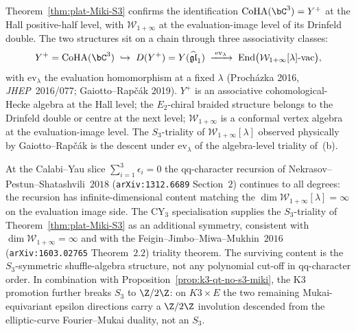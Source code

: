 \begin{remark}
\label{rem:coha-c3-equals-yplus-not-Winf}
Theorem~\ref{thm:plat-Miki-S3} confirms the identification
$\mathrm{CoHA}(\bC^3) = Y^+$ at the Hall positive-half level, with
$\mathcal W_{1 + \infty}$ at the evaluation-image level of its
Drinfeld double. The two structures sit on a chain through three
associativity classes:
\[
 Y^+ = \mathrm{CoHA}(\bC^3)
 \;\hookrightarrow\;
 D(Y^+) = Y(\widehat{\mathfrak{gl}}_1)
 \;\xrightarrow{\;\mathrm{ev}_\lambda\;}\;
 \mathrm{End}\bigl(\mathcal W_{1 + \infty}[\lambda]\text{-}\mathrm{vac}\bigr),
\]
with $\mathrm{ev}_\lambda$ the evaluation homomorphism at a fixed
$\lambda$ (Proch\'azka 2016, \emph{JHEP}\ 2016/077;
Gaiotto--Rap\v c\'ak 2019). $Y^+$ is an associative
cohomological-Hecke algebra at the Hall level; the $E_2$-chiral
braided structure belongs to the Drinfeld double or centre at the
next level; $\mathcal W_{1 + \infty}$ is a conformal vertex algebra
at the evaluation-image level. The $S_3$-triality of
$\mathcal W_{1 + \infty}[\lambda]$ observed physically by
Gaiotto--Rap\v c\'ak is the descent under $\mathrm{ev}_\lambda$ of
the algebra-level triality of~(b).
\end{remark}

\begin{remark}
\label{rmk:plat-CY3-non-truncation}
At the Calabi--Yau slice $\sum_{i=1}^{3} \epsilon_i = 0$ the
qq-character recursion of Nekrasov--Pestun--Shatashvili~$2018$
(\texttt{arXiv:1312.6689} Section~$2$) continues to all degrees: the
recursion has infinite-dimensional content matching the
$\dim \mathcal W_{1 + \infty}[\lambda] = \infty$ on the evaluation
image side. The CY$_3$ specialisation supplies the $S_3$-triality of
Theorem~\ref{thm:plat-Miki-S3} as an
additional symmetry, consistent with $\dim\mathcal W_{1+\infty}=\infty$
and with the Feigin--Jimbo--Miwa--Mukhin~$2016$
(\texttt{arXiv:1603.02765} Theorem~$2.2$) triality theorem. The
surviving content is the $S_3$-symmetric shuffle-algebra structure, not
any polynomial cut-off in qq-character order. In combination with
Proposition~\ref{prop:k3-qt-no-s3-miki}, the K3 promotion further
breaks $S_3$ to $\Z/2\Z$: on $K3\times E$ the two remaining
Mukai-equivariant epsilon directions carry a $\Z/2\Z$ involution
descended from the elliptic-curve Fourier--Mukai duality, not an $S_3$.
\end{remark}

